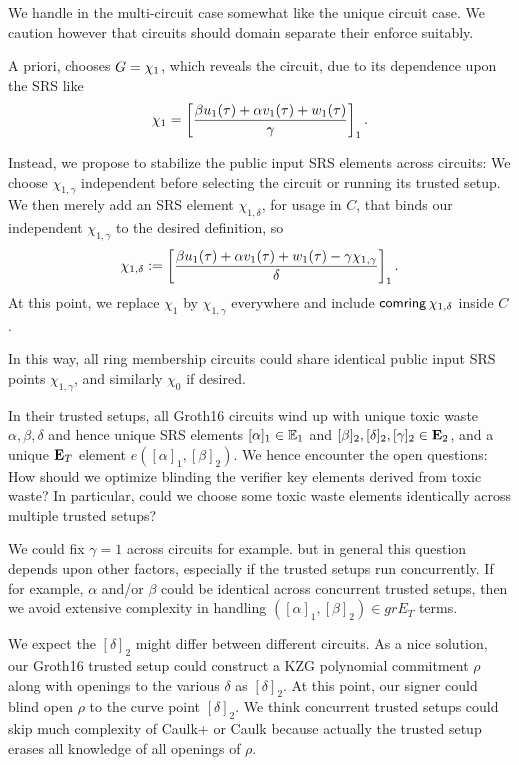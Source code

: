 We handle \comring in the multi-circuit case somewhat like the
unique circuit case.  We caution however that circuits should domain
separate their enforce \comring suitably.

\smallskip

A priori, \pifast chooses $G = \chi_1$, which reveals the circuit,
due to its dependence upon the SRS like
$$ \chi_1 = \left[ {\beta u_1(\tau) + \alpha v_1(\tau) + w_1(\tau) \over \gamma} \right]_1 . $$

Instead, we propose to stabilize the public input SRS elements across circuits:
We choose $\chi_{1,\gamma}$ independent before selecting the circuit
or running its trusted setup.
We then merely add an SRS element $\chi_{1,\delta}$, for usage in $C$, that binds
our independent $\chi_{1,\gamma}$ to the desired definition, so
$$ \chi_{1,\delta} := \left[ {\beta u_1(\tau) + \alpha v_1(\tau) + w_1(\tau) - \gamma \chi_{1,\gamma} \over \delta} \right]_1 . $$
At this point, we replace $\chi_1$ by $\chi_{1,\gamma}$ everywhere and
include $\mathsf{comring} \, \chi_{1,\delta}$ inside $C$.

In this way, all ring membership circuits could share identical
public input SRS points $\chi_{1,\gamma}$, and similarly $\chi_0$ if desired.

\smallskip

In their trusted setups, all Groth16 circuits wind up with unique
toxic waste $\alpha,\beta,\delta$ and hence unique SRS elements
$[\alpha]_1 \in {\mathbb{E}}_1$ and $[\beta]_2, [\delta]_2, [\gamma]_2 \in {\mathbf{E}}_2$,
and a unique ${\mathbf{E}}_T$ element $e([\alpha]_1, [\beta]_2)$.
We hence encounter the open questions:
How should we optimize blinding the verifier key elements derived from toxic waste?
In particular, could we choose some toxic waste elements identically across multiple trusted setups?

We could fix $\gamma=1$ across circuits for example. but in general
this question depends upon other factors, especially if the trusted setups
run concurrently.
If for example, $\alpha$ and/or $\beta$ could be identical across
concurrent trusted setups, then we avoid extensive complexity in
 handling $([\alpha]_1, [\beta]_2) \in grE_T$ terms.

We expect the $[\delta]_2$ might differ between different circuits.
As a nice solution, our Groth16 trusted setup could construct a
KZG polynomial commitment $\rho$ along with openings to the
various $\delta$ as $[\delta]_2$.  At this point, our signer could
blind open $\rho$ to the curve point $[\delta]_2$.
We think concurrent trusted setups could skip much complexity of
Caulk+ \cite{caulk+} or Caulk \cite{caulk} because actually the
 trusted setup erases all knowledge of all openings of $\rho$.

\endinput



\subsection{Post-quantum}





\subsection{SnarkPack}

TODO: Handle $\pi$ hashes?


